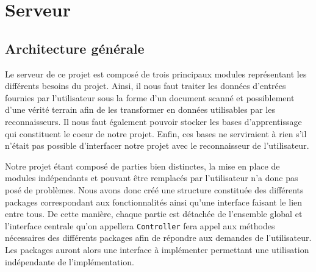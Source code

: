 \chapter{Serveur}

\section{Architecture générale}

Le serveur de ce projet est composé de trois principaux modules représentant les différents besoins du projet. Ainsi, il nous faut traiter les données d'entrées fournies par l'utilisateur sous la forme d'un document scanné et possiblement d'une vérité terrain afin de les transformer en données utilisables par les reconnaisseurs. Il nous faut également pouvoir stocker les bases d'apprentissage qui constituent le coeur de notre projet. Enfin, ces bases ne serviraient à rien s'il n'était pas possible d'interfacer notre projet avec le reconnaisseur de l'utilisateur.

Notre projet étant composé de parties bien distinctes, la mise en place de modules indépendants et pouvant être remplacés par l'utilisateur n'a donc pas posé de problèmes. Nous avons donc créé une structure constituée des différents packages correspondant aux fonctionnalités ainsi qu'une interface faisant le lien entre tous. De cette manière, chaque partie est détachée de l'ensemble global et l'interface centrale qu'on appellera \texttt{Controller} fera appel aux méthodes nécessaires des différents packages afin de répondre aux demandes de l'utilisateur. Les packages auront alors une interface à implémenter permettant une utilisation indépendante de l'implémentation.


